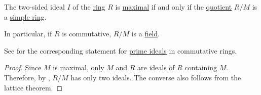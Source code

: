 \begin{corollary}\label{thm:quotient_by_maximal_ideal}
  The two-sided ideal \( I \) of the \hyperref[def:ring]{ring} \( R \) is \hyperref[def:semiring_ideal/maximal]{maximal} if and only if the \hyperref[def:ring/quotient]{quotient} \( R / M \) is a \hyperref[def:simple_object]{simple ring}.

  In particular, if \( R \) is commutative, \( R / M \) is a \hyperref[def:field]{field}.
\end{corollary}
\begin{comments}
  \item See  for the corresponding statement for \hyperref[def:semiring_ideal/prime]{prime ideals} in commutative rings.
\end{comments}
\begin{proof}
  Since \( M \) is maximal, only \( M \) and \( R \) are ideals of \( R \) containing \( M \). Therefore, by , \( R / M \) has only two ideals. The converse also follows from the lattice theorem.
\end{proof}

